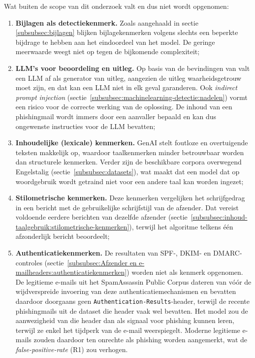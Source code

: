 Wat buiten de scope van dit onderzoek valt en dus niet wordt opgenomen:
\begin{enumerate}
    \item \textbf{Bijlagen als detectiekenmerk.} Zoals aangehaald in sectie \ref{subsubsec:bijlagen} blijken bijlagekenmerken volgens \textcite{Mendes2025} slechts een beperkte bijdrage te hebben aan het eindoordeel van het model. De geringe meerwaarde weegt niet op tegen de bijkomende complexiteit;
    \item \textbf{LLM's voor beoordeling en uitleg.} Op basis van de bevindingen van \textcite{Turpin2023} valt een LLM af als generator van uitleg, aangezien de uitleg waarheidsgetrouw moet zijn, en dat kan een LLM niet in elk geval garanderen. Ook \emph{indirect prompt injection} \autocite{Greshake2023} (sectie~\ref{subsubsec:machinelearning-detectie:nadelen}) vormt een risico voor de correcte werking van de oplossing. De inhoud van een phishingmail wordt immers door een aanvaller bepaald en kan dus ongewenste instructies voor de LLM bevatten;
    \item \textbf{Inhoudelijke (lexicale) kenmerken.} GenAI stelt foutloze en overtuigende teksten makkelijk op, waardoor taalkenmerken minder betrouwbaar worden dan structurele kenmerken. Verder zijn de beschikbare corpora overwegend Engelstalig \autocite{Pajola2025} (sectie~\ref{subsubsec:datasets}), wat maakt dat een model dat op woordgebruik wordt getraind niet voor een andere taal kan worden ingezet;
    \item \textbf{Stilometrische kenmerken.} Deze kenmerken vergelijken het schrijfgedrag in een bericht met de gebruikelijke schrijfstijl van de afzender. Dat vereist voldoende eerdere berichten van dezelfde afzender \autocite{Stringhini2014} (sectie~\ref{subsubsec:inhoud-taalgebruik:stilometrische-kenmerken}), terwijl het algoritme telkens één afzonderlijk bericht beoordeelt;
    \item \textbf{Authenticatiekenmerken.} De resultaten van SPF-, DKIM- en DMARC-controles (sectie~\ref{subsubsec:Afzender en e-mailheaders:authenticatiekenmerken}) worden niet als kenmerk opgenomen. De legitieme e-mails uit het SpamAssassin Public Corpus dateren van vóór de wijdverspreide invoering van deze authenticatiemechanismen en bevatten daardoor doorgaans geen \texttt{Authentication-Results}-header, terwijl de recente phishingmails uit de dataset die header vaak wel bevatten. Het model zou de aanwezigheid van die header dan als signaal voor phishing kunnen leren, terwijl ze enkel het tijdperk van de e-mail weerspiegelt. Moderne legitieme e-mails zouden daardoor ten onrechte als phishing worden aangemerkt, wat de \emph{false-positive-rate} (R1) zou verhogen.
\end{enumerate}